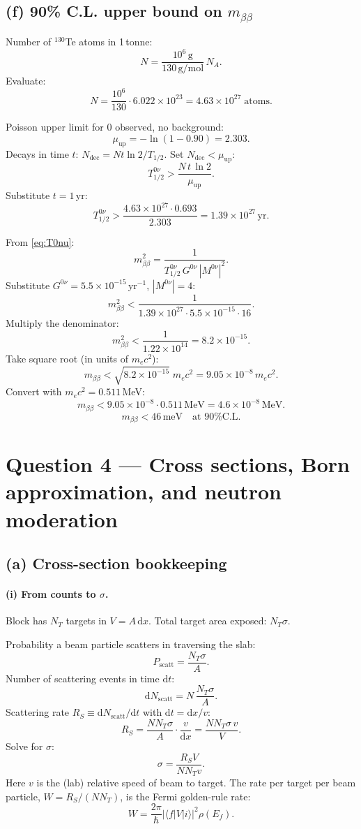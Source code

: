 \documentclass[11pt]{article}
\newcommand{\de}{\mathrm{d}}
\begin{document}
\subsection*{(f) 90\% C.L. upper bound on $m_{\beta\beta}$}

Number of $^{130}$Te atoms in 1\,tonne:
\[
N=\frac{10^6\,\mathrm{g}}{130\,\mathrm{g/mol}}\,N_A.
\]
Evaluate:
\[
N=\frac{10^6}{130}\cdot 6.022\times 10^{23}=4.63\times 10^{27}\;\text{atoms}.
\]

Poisson upper limit for 0 observed, no background:
\[
\mu_\mathrm{up}=-\ln(1-0.90)=2.303.
\]
Decays in time $t$: $N_\mathrm{dec}=Nt\ln 2/T_{1/2}$. Set $N_\mathrm{dec}<\mu_\mathrm{up}$:
\[
T_{1/2}^{0\nu}>\frac{N\,t\,\ln 2}{\mu_\mathrm{up}}.
\]
Substitute $t=1$\,yr:
\[
T_{1/2}^{0\nu}>\frac{4.63\times 10^{27}\cdot 0.693}{2.303}=1.39\times 10^{27}\,\mathrm{yr}.
\]

From \eqref{eq:T0nu}:
\[
m_{\beta\beta}^2=\frac{1}{T_{1/2}^{0\nu}\,G^{0\nu}\,|M^{0\nu}|^2}.
\]
Substitute $G^{0\nu}=5.5\times 10^{-15}$\,yr$^{-1}$, $|M^{0\nu}|=4$:
\[
m_{\beta\beta}^2 < \frac{1}{1.39\times 10^{27}\cdot 5.5\times 10^{-15}\cdot 16}.
\]
Multiply the denominator:
\[
m_{\beta\beta}^2 < \frac{1}{1.22\times 10^{14}}=8.2\times 10^{-15}.
\]
Take square root (in units of $m_e c^2$):
\[
m_{\beta\beta} < \sqrt{8.2\times 10^{-15}}\;m_e c^2 = 9.05\times 10^{-8}\,m_e c^2.
\]
Convert with $m_e c^2=0.511$\,MeV:
\[
m_{\beta\beta} < 9.05\times 10^{-8}\cdot 0.511\,\mathrm{MeV}=4.6\times 10^{-8}\,\mathrm{MeV}.
\]
\begin{equation}
\boxed{\;m_{\beta\beta}<46\,\mathrm{meV}\quad\text{at 90\% C.L.}\;}
\end{equation}

\section*{Question 4 --- Cross sections, Born approximation, and neutron moderation}

\subsection*{(a) Cross-section bookkeeping}

\paragraph{(i) From counts to $\sigma$.} Block has $N_T$ targets in $V=A\,\de x$. Total target area exposed: $N_T\sigma$.

Probability a beam particle scatters in traversing the slab:
\[
P_\mathrm{scatt}=\frac{N_T\sigma}{A}.
\]
Number of scattering events in time $\de t$:
\[
\de N_\mathrm{scatt}=N\,\frac{N_T\sigma}{A}.
\]
Scattering rate $R_S\equiv\de N_\mathrm{scatt}/\de t$ with $\de t=\de x/v$:
\[
R_S=\frac{N N_T\sigma}{A}\cdot\frac{v}{\de x}=\frac{N N_T\sigma\,v}{V}.
\]
Solve for $\sigma$:
\[
\boxed{\;\sigma=\frac{R_S V}{N N_T v}.\;}
\]
Here $v$ is the (lab) relative speed of beam to target. The rate per target per beam particle, $W=R_S/(NN_T)$, is the Fermi golden-rule rate:
\[
W=\frac{2\pi}{\hbar}|\langle f|V|i\rangle|^2\rho(E_f).
\]
\end{document}
